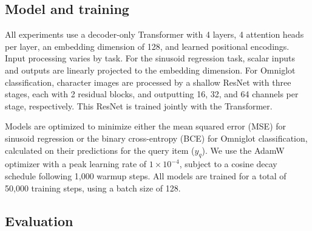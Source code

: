 
\subsection{Model and training}

All experiments use a decoder-only Transformer with 4 layers, 4 attention heads per layer, an embedding dimension of 128, and learned positional encodings.
Input processing varies by task. For the sinusoid regression task, scalar inputs and outputs are linearly projected to the embedding dimension. For Omniglot classification, character images are processed by a shallow ResNet with three stages, each with 2 residual blocks, and outputting 16, 32, and 64 channels per stage, respectively. This ResNet is trained jointly with the Transformer.

Models are optimized to minimize either the mean squared error (MSE) for sinusoid regression or the binary cross-entropy (BCE) for Omniglot classification, calculated on their predictions for the query item ($y_q$). We use the AdamW optimizer \cite{loshchilov2017decoupled} with a peak learning rate of $1 \times 10^{-4}$, subject to a cosine decay schedule following 1,000 warmup steps. All models are trained for a total of 50,000 training steps, using a batch size of 128.

\subsection{Evaluation}

